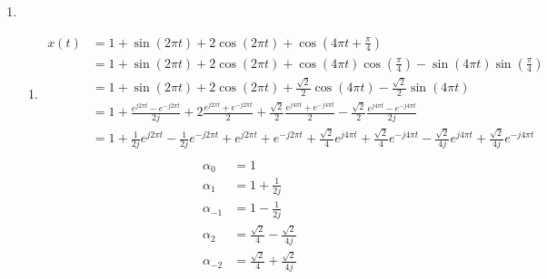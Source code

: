 \documentclass[10pt,a4paper, margin=1in]{article}
\begin{document}
\begin{enumerate}
\item %
    \begin{enumerate}   
    \item %
    \begin{align*}
        x(t) & = 1 + \sin(2\pi t) + 2\cos(2\pi t) + \cos(4\pi  t + \frac{\pi}{4}) \\
        & = 1 + \sin(2\pi t) + 2\cos(2\pi t) + \cos(4\pi  t)\cos(\frac{\pi}{4}) - \sin(4\pi  t)\sin(\frac{\pi}{4}) \\
        & = 1 + \sin(2\pi t) + 2\cos(2\pi t) + \frac{\sqrt{2}}{2}\cos(4\pi  t) - \frac{\sqrt{2}}{2}\sin(4\pi  t) \\
        & = 1 + \frac{e^{j2\pi t} - e^{-j2\pi t}}{2j} + 2\frac{e^{j2\pi t} + e^{-j2\pi t}}{2} + \frac{\sqrt{2}}{2}\frac{e^{j4\pi  t} + e^{-j4\pi  t}}{2} - \frac{\sqrt{2}}{2}\frac{e^{j4\pi  t} - e^{-j4\pi  t}}{2j} \\
        & = 1 + \frac{1}{2j}e^{j2\pi t} - \frac{1}{2j}e^{-j2\pi t} + e^{j2\pi t} + e^{-j2\pi t} + \frac{\sqrt{2}}{4}e^{j4\pi  t} + \frac{\sqrt{2}}{4}e^{-j4\pi  t} - \frac{\sqrt{2}}{4j}e^{j4\pi  t} + \frac{\sqrt{2}}{4j}e^{-j4\pi  t} \\
    \end{align*}
    \begin{align*}
        \alpha_0 & = 1 \\
        \alpha_1 & = 1 + \frac{1}{2j}\\
        \alpha_{-1} & = 1 - \frac{1}{2j}\\
        \alpha_2 & = \frac{\sqrt{2}}{4} - \frac{\sqrt{2}}{4j}\\
        \alpha_{-2} & = \frac{\sqrt{2}}{4} + \frac{\sqrt{2}}{4j}\\
    \end{align*}


\end{enumerate}
\end{enumerate}
\end{document}
